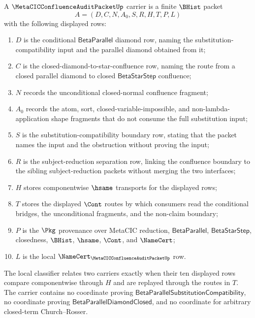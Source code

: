 \begin{definition}
\label{def:metacic-confluence-audit-packet-carrier}
A $\MetaCICConfluenceAuditPacketUp$ carrier is a finite $\BHist$ packet
$$
A=(D,C,N,A_0,S,R,H,T,P,L)
$$
with the following displayed rows:
\begin{enumerate}
\item $D$ is the conditional $\mathsf{BetaParallel}$ diamond row, naming the
substitution-compatibility input and the parallel diamond obtained from it;
\item $C$ is the closed-diamond-to-star-confluence row, naming the route from a
closed parallel diamond to closed $\mathsf{BetaStarStep}$ confluence;
\item $N$ records the unconditional closed-normal confluence fragment;
\item $A_0$ records the atom, sort, closed-variable-impossible, and
non-lambda-application shape fragments that do not consume the full
substitution input;
\item $S$ is the substitution-compatibility boundary row, stating that the
packet names the input and the obstruction without proving the input;
\item $R$ is the subject-reduction separation row, linking the confluence
boundary to the sibling subject-reduction packets without merging the two
interfaces;
\item $H$ stores componentwise $\hsame$ transports for the displayed rows;
\item $T$ stores the displayed $\Cont$ routes by which consumers read the
conditional bridges, the unconditional fragments, and the non-claim boundary;
\item $P$ is the $\Pkg$ provenance over MetaCIC reduction, $\mathsf{BetaParallel}$,
$\mathsf{BetaStarStep}$, closedness, $\BHist$, $\hsame$, $\Cont$, and
$\NameCert$;
\item $L$ is the local $\NameCert_{\MetaCICConfluenceAuditPacketUp}$ row.
\end{enumerate}
The local classifier relates two carriers exactly when their ten displayed
rows compare componentwise through $H$ and are replayed through the routes in
$T$. The carrier contains no coordinate proving
$\mathsf{BetaParallelSubstitutionCompatibility}$, no coordinate proving
$\mathsf{BetaParallelDiamondClosed}$, and no coordinate for arbitrary
closed-term Church--Rosser.
\end{definition}


